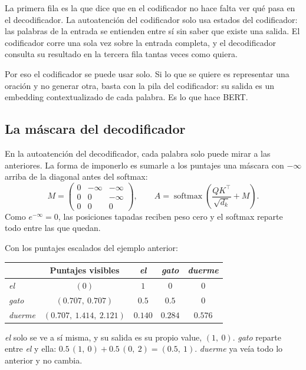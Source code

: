 \documentclass[11pt,letterpaper]{article}
\begin{document}
La primera fila es la que dice que en el codificador no hace falta ver
qué pasa en el decodificador. La autoatención del codificador solo usa
estados del codificador: las palabras de la entrada se entienden entre
sí sin saber que existe una salida. El codificador corre una sola vez
sobre la entrada completa, y el decodificador consulta su resultado en
la tercera fila tantas veces como quiera.

\begin{idea}
    Por eso el codificador se puede usar solo. Si lo que se quiere es
    representar una oración y no generar otra, basta con la pila del
    codificador: su salida es un embedding contextualizado de cada
    palabra. Es lo que hace BERT.
\end{idea}


\subsection*{La máscara del decodificador}

En la autoatención del decodificador, cada palabra solo puede mirar a
las anteriores. La forma de imponerlo es sumarle a los puntajes una
máscara con $-\infty$ arriba de la diagonal antes del softmax:
\[
    M = \begin{pmatrix} 0 & -\infty & -\infty \\
                        0 & 0       & -\infty \\
                        0 & 0       & 0 \end{pmatrix} ,
    \qquad
    A = \operatorname{softmax}\!\left(\frac{Q K^{\top}}{\sqrt{d_k}}
        + M\right) .
\]
Como $e^{-\infty} = 0$, las posiciones tapadas reciben peso cero y el
softmax reparte todo entre las que quedan.

\begin{ejemplo}
    Con los puntajes escalados del ejemplo anterior:
    \begin{center}
    \begin{tabular}{lcccc}
        \toprule
        & \textbf{Puntajes visibles} & \textit{el} & \textit{gato}
        & \textit{duerme} \\
        \midrule
        \textit{el}     & $(0)$                 & $1$     & $0$
                        & $0$ \\
        \textit{gato}   & $(0.707,\ 0.707)$     & $0.5$   & $0.5$
                        & $0$ \\
        \textit{duerme} & $(0.707,\ 1.414,\ 2.121)$ & $0.140$
                        & $0.284$ & $0.576$ \\
        \bottomrule
    \end{tabular}
    \end{center}
    \textit{el} solo se ve a sí misma, y su salida es su propio value,
    $(1,\ 0)$. \textit{gato} reparte entre \textit{el} y ella:
    $0.5\,(1,\ 0) + 0.5\,(0,\ 2) = (0.5,\ 1)$. \textit{duerme} ya veía
    todo lo anterior y no cambia.
\end{ejemplo}
\end{document}
